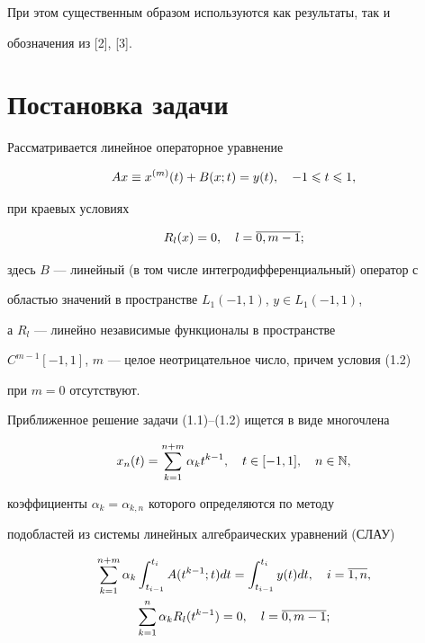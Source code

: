 При этом существенным образом используются как результаты, так и 


обозначения из [2], [3].








\section{Постановка задачи}





Рассматривается линейное операторное уравнение


\begin{equation}


Ax\equiv x^{(m)}(t)+B(x;t) = y(t),\quad -1\lea t\lea 1,


\end{equation}


при краевых условиях


\begin{equation}


R_l(x)=0,\quad l=\ol{0,m-1};


\end{equation}


здесь $B$ --- линейный (в том числе интегродифференциальный) оператор с 


областью значений в пространстве $L_1(-1,1)$, $y\in L_1(-1,1)$,


а $R_l$ --- линейно независимые функционалы в пространстве


$C^{m-1}[-1,1]$, $m$ --- целое неотрицательное число, причем условия (1.2) 


при $m=0$ отсутствуют.





Приближенное решение задачи (1.1)--(1.2) ищется в виде многочлена


\begin{equation}


x_n(t)=\suml_{k=1}^{n+m}\alpha_k t^{k-1},\quad t\in [-1,1],\quad n\in \N,


\end{equation}


коэффициенты $\alpha_k=\alpha_{k,n}$ которого определяются по методу 


подобластей из системы линейных алгебраических уравнений (СЛАУ)


\begin{gather}


\suml_{k=1}^{n+m}\alpha_k \int_{t_{i-1}}^{t_i} A(t^{k-1};t)dt =


\int_{t_{i-1}}^{t_i}y(t)dt,\quad i=\ol{1,n},\\


%


\suml_{k=1}^n\alpha_k R_l(t^{k-1})=0,\quad l=\ol{0,m-1};


\end{gather}


